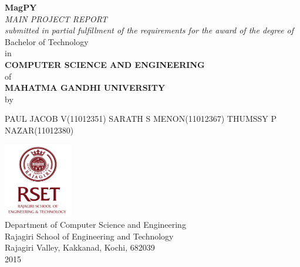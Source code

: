 \documentclass[a4paper]{report}
\begin{document}

\titlepage 
\begin{center}
\LARGE\textbf{MagPY}\\[.5cm]
\large\textit{MAIN PROJECT REPORT}\\[0.5cm]
\textit{submitted in partial fulfillment of the requirements for the award of the degree of}\\[.5cm]
\textnormal{Bachelor of Technology}\\[0.5cm]
\textnormal{in}\\[.5cm]
\large \textbf {COMPUTER SCIENCE AND ENGINEERING}\\[.5cm]
\textnormal{of}\\[.5cm]
\large \textbf {MAHATMA GANDHI UNIVERSITY}\\[.5cm]
\textnormal{by}\\[.5cm]
\large \bfseries{








PAUL JACOB V(11012351)\newline
SARATH S MENON(11012367)\newline
THUMSSY P NAZAR(11012380)\newline













}

\vspace{0.25cm}
\includegraphics[width=3.0cm]{logo.png}\\[0.5cm]
\vspace{.25cm}
\textnormal{Department of Computer Science and Engineering}\\[0.5cm]
\textnormal{Rajagiri School of Engineering and Technology}\\[0.5cm]
\textnormal{Rajagiri Valley, Kakkanad, Kochi, 682039}\\[0.5cm]
\textnormal{2015}\\[0.5cm]
\end{center}
\end{document}
